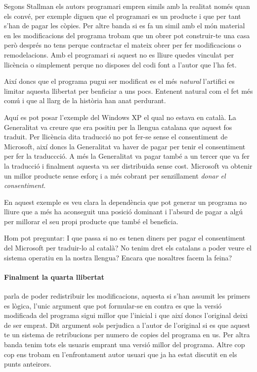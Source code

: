 \documentclass[a4paper,11pt]{scrartcl}
\begin{document}
Segons Stallman els autors programari empren simils amb la realitat només
quan els convé, per exemple diguen que el programari es un producte i que
per tant s'han de pagar les còpies. Per altre banda si es fa un simil
amb el món material en les modificacions del programa trobam que
un obrer pot construir-te una casa però després no tens perque contractar
el mateix obrer per fer modificacions o remodelacions. Amb el programari
si aquest no es lliure quedes vinculat per llicència o simplement
perque no disposes del codi font a l'autor que l'ha fet.

Així doncs que el programa pugui ser modificat es el més \emph{natural}
l'artifici es limitar aquesta llibertat per benficiar a uns pocs.
Entenent natural com el fet més comú i que al llarg de la història
han anat perdurant.

Aquí es pot posar l'exemple del Windows XP el qual no estava en català.
La Generalitat va creure que era positiu per la llengua catalana
que aquest fos traduit. Per llicència dita traducció no pot fer-se
sense el consentiment de Microsoft, així doncs la Generalitat
va haver de pagar per tenir el consentiment per fer la traduccció.
A més la Generalitat va pagar també a un tercer que va fer la traducció
i finalment aquesta va ser distribuida sense cost.
Microsoft va obtenir un millor producte sense esforç i a més
cobrant per senzillament \emph{donar el consentiment}.

En aquest exemple es veu clara la dependència que pot generar un programa
no lliure que a més ha aconseguit una posició dominant i l'absurd
de pagar a algú  per millorar el seu propi producte que també el beneficia.

Hom pot preguntar: I que passa si no es tenen diners per pagar el
consentiment del Microsoft per traduir-lo al català?
No tenim dret els catalans a poder veure el sistema operatiu
en la nostra llengua? Encara que nosaltres facem la feina?

\paragraph{Finalment la quarta llibertat} parla de poder redistribuir les modificacions,
aquesta si s'han assumit les primers es lògica, l'unic argument
que pot formular-se en contra es que la versió modificada del programa
sigui millor que l'inicial i que així doncs l'original deixi de ser
emprat. Dit argument sols perjudica a l'autor de l'original si 
es que aquest te un sistema de retribucions per numero de copies del programa
en us. Per altra banda tenim tots els usuaris emprant una versió millor
del programa. Altre cop cop ens trobam en l'enfrontament autor usuari
que ja ha estat discutit en els punts anteirors.
\end{document}
